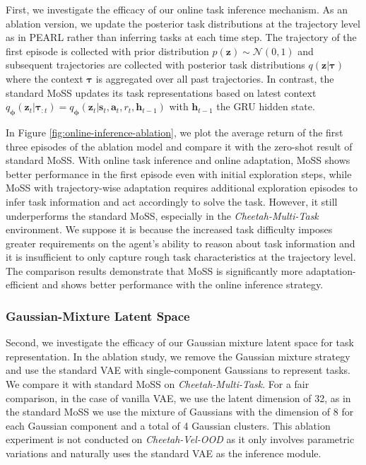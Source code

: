 \documentclass[letterpaper]{article} %
\begin{document}
First, we investigate the efficacy of our online task inference mechanism. As an ablation version, we update the posterior task distributions at the trajectory level as in PEARL \cite{PEARL} rather than inferring tasks at each time step. The trajectory of the first episode is collected with prior distribution $p(\bm z) \sim \mathcal{N}(0, 1)$ and subsequent trajectories are collected with posterior task distributions $q(\bm z|\bm \tau)$ where the context $\bm \tau$ is aggregated over all past trajectories. In contrast, the standard MoSS updates its task representations based on latest context $q_{\bm \phi}(\bm z_{t}| \bm \tau_{:t}) = q_{\bm \phi}(\bm z_{t}| \bm s_{t}, \bm a_{t}, r_{t}, \bm h_{t-1})$ with $\bm h_{t-1}$ the GRU hidden state.

In Figure \ref{fig:online-inference-ablation}, we plot the average return of the first three episodes of the ablation model and compare it with the zero-shot result of standard MoSS. With online task inference and online adaptation, MoSS shows better performance in the first episode even with initial exploration steps, while MoSS with trajectory-wise adaptation requires additional exploration episodes to infer task information and act accordingly to solve the task. However, it still underperforms the standard MoSS, especially in the \emph{Cheetah-Multi-Task} environment. We suppose it is because the increased task difficulty imposes greater requirements on the agent's ability to reason about task information and it is insufficient to only capture rough task characteristics at the trajectory level. The comparison results demonstrate that MoSS is significantly more adaptation-efficient and shows better performance with the online inference strategy.

\subsubsection{Gaussian-Mixture Latent Space}
Second, we investigate the efficacy of our Gaussian mixture latent space for task representation. In the ablation study, we remove the Gaussian mixture strategy and use the standard VAE with single-component Gaussians to represent tasks. We compare it with standard MoSS on \emph{Cheetah-Multi-Task}. For a fair comparison, in the case of vanilla VAE, we use the latent dimension of 32, as in the standard MoSS we use the mixture of Gaussians with the dimension of 8 for each Gaussian component and a total of 4 Gaussian clusters. This ablation experiment is not conducted on \emph{Cheetah-Vel-OOD} as it only involves parametric variations and naturally uses the standard VAE as the inference module.
\end{document}
